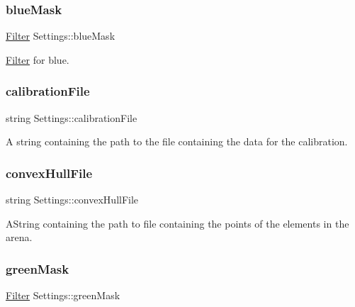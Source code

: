 \mbox{\label{class_settings_a2b425f747b936e82dfe0b609538f06f1}} 
\subsubsection{\texorpdfstring{blueMask}{blueMask}}
{\footnotesize\ttfamily \mbox{\hyperlink{class_filter}{Filter}} Settings\+::blue\+Mask}



\mbox{\hyperlink{class_filter}{Filter}} for blue. 

\mbox{\label{class_settings_ac6ff9ca8d90b9e43e26c069c88b7c699}} 
\subsubsection{\texorpdfstring{calibrationFile}{calibrationFile}}
{\footnotesize\ttfamily string Settings\+::calibration\+File}



A string containing the path to the file containing the data for the calibration. 

\mbox{\label{class_settings_aae9ea78e634fee8a76c2eb2b6fd09eeb}} 
\subsubsection{\texorpdfstring{convexHullFile}{convexHullFile}}
{\footnotesize\ttfamily string Settings\+::convex\+Hull\+File}



A\+String containing the path to file containing the points of the elements in the arena. 

\mbox{\label{class_settings_a05138be305e15677c8a84ddf27e4d9e8}} 
\subsubsection{\texorpdfstring{greenMask}{greenMask}}
{\footnotesize\ttfamily \mbox{\hyperlink{class_filter}{Filter}} Settings\+::green\+Mask}



